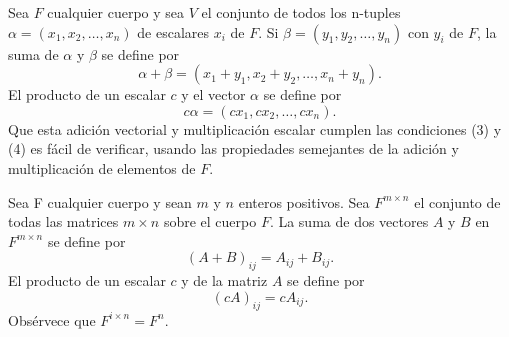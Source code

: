 \begin{ejem}
    Sea $F$ cualquier cuerpo y sea $V$ el conjunto de todos los n-tuples $\alpha=(x_1,x_2,\ldots,x_n)$ de escalares $x_i$ de $F$. Si $\beta = (y_1,y_2,\ldots , y_n)$ con $y_i$ de $F$, la suma de $\alpha$ y $\beta$ se define por
    \begin{equation}
	\alpha+\beta = (x_1+y_1,x_2+y_2,\ldots,x_n+y_n).
    \end{equation}
    El producto de un escalar $c$ y el vector $\alpha$ se define por 
    \begin{equation}
	c\alpha = (cx_1,cx_2,\ldots,cx_n).
    \end{equation}
    Que esta adición vectorial y multiplicación escalar cumplen las condiciones (3) y (4) es fácil de verificar, usando las propiedades semejantes de la adición y multiplicación de elementos de $F$.
\end{ejem}

\begin{ejem} Sea F cualquier cuerpo y sean $m$ y $n$ enteros positivos. Sea $F^{m\times n}$ el conjunto de todas las matrices $m\times n$ sobre el cuerpo $F$. La suma de dos vectores $A$ y $B$ en $F^{m\times n}$ se define por 
    \begin{equation}
	(A+B)_{ij}=A_{ij}+B_{ij}.
    \end{equation}
    El producto de un escalar $c$ y de la matriz $A$ se define por 
    \begin{equation}
	(cA)_{ij} = cA_{ij}.
    \end{equation}
    Obsérvece que $F^{i\times n}=F^n$.
\end{ejem}

